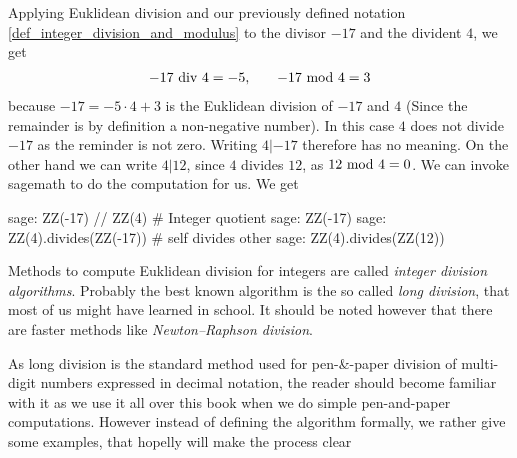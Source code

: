 \begin{example} Applying Euklidean division and our previously defined notation \ref{def_integer_division_and_modulus} to the divisor $-17$ and the divident $4$, we get 
\begin{equation*}
\begin{array}{lcr}
-17 \text{ div } 4 = - 5, & & -17 \text{ mod } 4 = 3
\end{array}
\end{equation*}
because $ -17 = -5 \cdot 4 + 3 $  is the Euklidean division of $-17$ and $4$ (Since the remainder is by definition a non-negative number). In this case $4$ does not divide $-17$ as the reminder is not zero. Writing $4 | -17 $ therefore has no meaning. On the other hand we can write $4 | 12$, since $4$ divides $12$, as $ 12 \text{ mod } 4 = 0 $. We can invoke sagemath to do the computation for us. We get
\begin{sagecommandline}
sage: ZZ(-17) // ZZ(4) # Integer quotient 
sage: ZZ(-17) %
sage: ZZ(4).divides(ZZ(-17)) # self divides other
sage: ZZ(4).divides(ZZ(12))
\end{sagecommandline}
\end{example}
Methods to compute Euklidean division for integers are called \textit{integer division algorithms}. Probably the best known algorithm is the so called \textit{long division}, that most of us might have learned in school. It should be noted however that there are faster methods like \textit{Newton–Raphson division}.

As long division is the standard method used for pen-\&-paper division of multi-digit numbers expressed in decimal notation, the reader should become familiar with it as we use it all over this book when we do simple pen-and-paper computations. However instead of defining the algorithm formally, we rather give some examples, that hopelly will make the process clear

